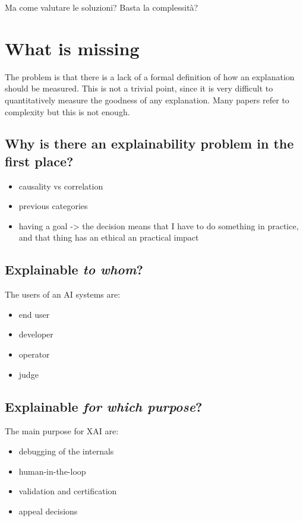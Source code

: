 \documentclass{article}
\begin{document}
Ma come valutare le soluzioni? Basta la complessità?

\section{What is missing}

The problem is that there is a lack of a formal definition of how an explanation should be measured. This is not a trivial point, since it is very difficult to quantitatively measure the goodness of any explanation. Many papers refer to complexity but this is not enough.

\subsection{Why is there an explainability problem in the first place?}

\begin{itemize}
    \item causality vs correlation
    \item previous categories
    \item having a goal -> the decision means that I have to do something in practice, and that thing has an ethical an practical impact
\end{itemize}

\subsection{Explainable \textit{to whom}?}

The users of an AI systems are:

\begin{itemize}
    \item end user
    \item developer
    \item operator
    \item judge
\end{itemize}

\subsection{Explainable \textit{for which purpose}?}

The main purpose for XAI are:

\begin{itemize}
    \item debugging of the internals
    \item human-in-the-loop
    \item validation and certification
    \item appeal decisions
\end{itemize}
\end{document}
